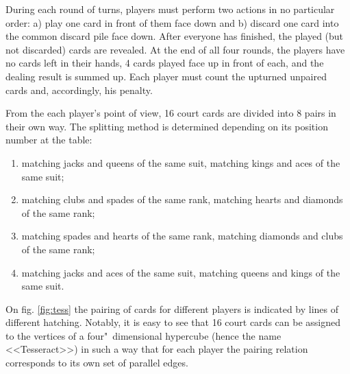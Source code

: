 During each round of turns, players must perform two actions in no particular order: a) play one card in front of them face down and b) discard one card into the common discard pile face down. After everyone has finished, the played (but not discarded) cards are revealed. At the end of all four rounds, the players have no cards left in their hands, 4 cards played face up in front of each, and the dealing result is summed up. Each player must count the upturned unpaired cards and, accordingly, his penalty. %

From the each player's point of view, 16 court cards are divided into 8 pairs in their own way. The splitting method is determined depending on its position number at the table: %
\begin{enumerate}
	\item matching jacks and queens of the same suit, matching kings and aces of the same suit; %
	\item matching clubs and spades of the same rank, matching hearts and diamonds of the same rank; %
	\item matching spades and hearts of the same rank, matching diamonds and clubs of the same rank; %
	\item matching jacks and aces of the same suit, matching queens and kings of the same suit. %
\end{enumerate}

On fig. \ref{fig:tess} the pairing of cards for different players is indicated by lines of different hatching. Notably, it is easy to see that 16 court cards can be assigned to the vertices of a four"~dimensional hypercube (hence the name <<Tesseract>>) in such a way that for each player the pairing relation corresponds to its own set of parallel edges. %

